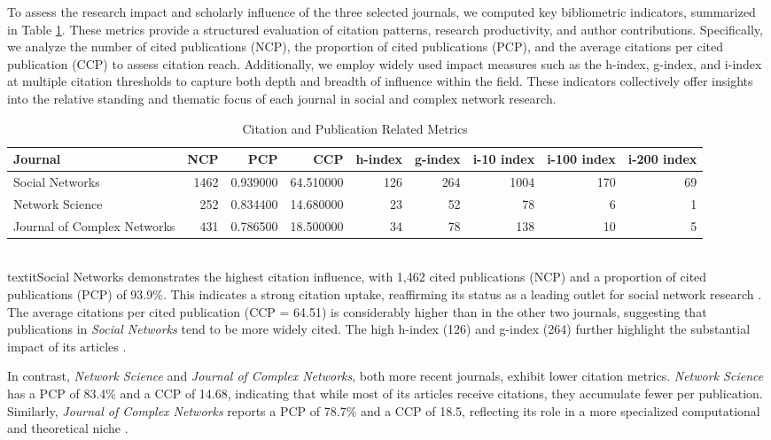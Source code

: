 \documentclass[twocolumn]{article}
\begin{document}
	To assess the research impact and scholarly influence of the three selected journals, we computed key bibliometric indicators, summarized in Table \ref{table.tab3}. These metrics provide a structured evaluation of citation patterns, research productivity, and author contributions. Specifically, we analyze the number of cited publications (NCP), the proportion of cited publications (PCP), and the average citations per cited publication (CCP) to assess citation reach. Additionally, we employ widely used impact measures such as the h-index, g-index, and i-index at multiple citation thresholds to capture both depth and breadth of influence within the field. These indicators collectively offer insights into the relative standing and thematic focus of each journal in social and complex network research.
	\begin{table}[htbp]
		\scriptsize
		\caption{Citation and Publication Related Metrics}\label{table.tab3}
		\begin{tabularx}{\textwidth}{l|r|r|r|r|r|r|r|r}
			\toprule
			Journal & NCP & PCP & CCP & h-index & g-index & i-10 index & i-100 index & i-200 index \\
			\midrule
			Social Networks & 1462 & 0.939000 & 64.510000 & 126 & 264 & 1004 & 170 & 69 \\
			Network Science & 252 & 0.834400 & 14.680000 & 23 & 52 & 78 & 6 & 1 \\
			Journal of Complex Networks & 431 & 0.786500 & 18.500000 & 34 & 78 & 138 & 10 & 5 \\
			\bottomrule
		\end{tabularx}
	\end{table}
	\\textit{Social Networks} demonstrates the highest citation influence, with 1,462 cited publications (NCP) and a proportion of cited publications (PCP) of 93.9\%. This indicates a strong citation uptake, reaffirming its status as a leading outlet for social network research \cite{Freeman2004, Borgatti2009}. The average citations per cited publication (CCP = 64.51) is considerably higher than in the other two journals, suggesting that publications in \textit{Social Networks} tend to be more widely cited. The high h-index (126) and g-index (264) further highlight the substantial impact of its articles \cite{Moody2004}.
	
	In contrast, \textit{Network Science} and \textit{Journal of Complex Networks}, both more recent journals, exhibit lower citation metrics. \textit{Network Science} has a PCP of 83.4\% and a CCP of 14.68, indicating that while most of its articles receive citations, they accumulate fewer per publication. Similarly, \textit{Journal of Complex Networks} reports a PCP of 78.7\% and a CCP of 18.5, reflecting its role in a more specialized computational and theoretical niche \cite{Newman2010, Barabasi2016}.
	
\end{document}
